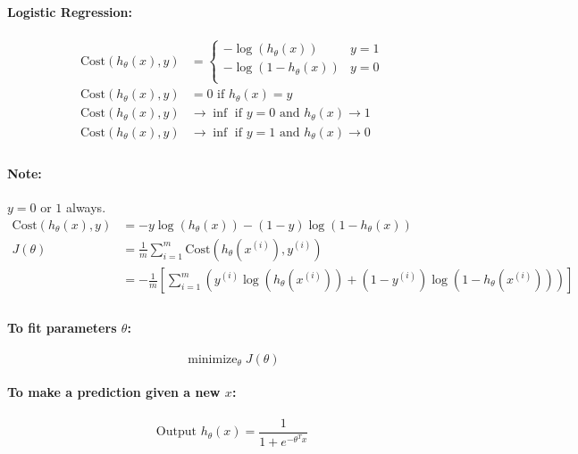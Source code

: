 \documentclass[a4paper, 12pt]{report}
\DeclareMathOperator*{\minimize}{minimize}
\def\tends{\rightarrow}
\begin{document}
\paragraph{Logistic Regression:}
\begin{align*}
	\mathrm{Cost}(h_\theta(x), y) & = \begin{cases}
		-\log(h_\theta(x))     & y = 1 \\
		-\log(1 - h_\theta(x)) & y = 0 \\
	\end{cases}    \\
	\mathrm{Cost}(h_\theta(x), y) & = 0 \text{ if } h_\theta(x) = y \\
	\mathrm{Cost}(h_\theta(x), y) &
	\tends \inf \text{ if } y = 0 \text{ and } h_\theta(x) \tends 1 \\
	\mathrm{Cost}(h_\theta(x), y) &
	\tends \inf \text{ if } y = 1 \text{ and } h_\theta(x) \tends 0 \\
\end{align*}

\paragraph{Note:} $y = 0$ or $1$ always.
\begin{align*}
	\mathrm{Cost}(h_\theta(x), y) &
	= -y\log(h_\theta(x)) - (1-y)\log(1 - h_\theta(x))                              \\
	J(\theta)                     &
	= \frac{1}{m}\sum_{i = 1}^m\mathrm{Cost}\left(h_\theta(x^{(i)}), y^{(i)}\right) \\
	                              &
	= -\frac{1}{m}\left[
		\sum_{i=1}^m\left(
		y^{(i)}\log(h_\theta(x^{(i)})) + (1 - y^{(i)})\log(1 - h_\theta(x^{(i)}))
		\right)
		\right]                                                                         \\
\end{align*}

\paragraph{To fit parameters $\theta$:}
\begin{equation*}
	\minimize_\theta J(\theta)
\end{equation*}

\paragraph{To make a prediction given a new $x$:}
\begin{equation*}
	\text{Output } h_\theta(x) = \frac{1}{1 + e^{-\theta^Tx}}
\end{equation*}
\end{document}
